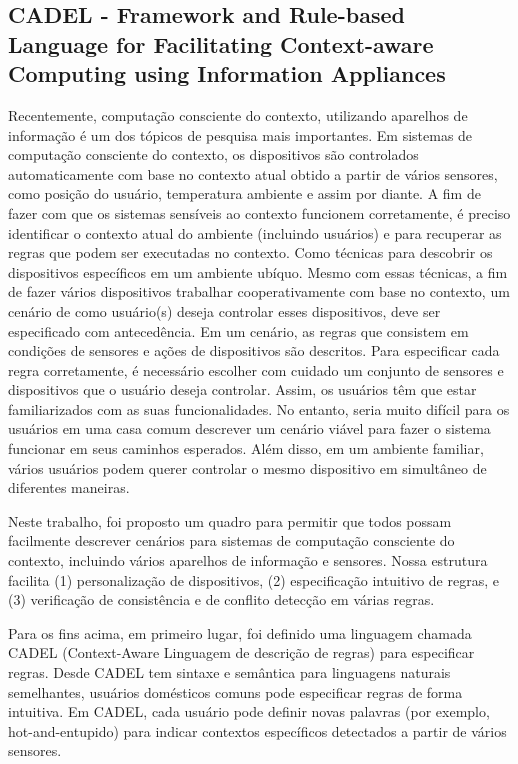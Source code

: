 \documentclass[12pt,a4paper,compsoc]{IEEEtran}
\begin{document}
\subsection{CADEL - Framework and Rule-based Language for Facilitating Context-aware Computing
 using Information Appliances}

  Recentemente, computação consciente do contexto, utilizando aparelhos de informação é um dos
  tópicos de pesquisa mais importantes. Em sistemas de computação consciente do contexto, os
  dispositivos são controlados automaticamente com base no contexto atual obtido a partir de vários
  sensores, como posição do usuário, temperatura ambiente e assim por diante. A fim de fazer com
  que os sistemas sensíveis ao contexto funcionem corretamente, é preciso identificar o contexto
  atual do ambiente (incluindo usuários) e para recuperar as regras que podem ser executadas no
  contexto. Como técnicas para descobrir os dispositivos específicos em um ambiente ubíquo. Mesmo
  com essas técnicas, a fim de fazer vários dispositivos trabalhar cooperativamente com base no
  contexto, um cenário de como usuário(s) deseja controlar esses dispositivos, deve ser
  especificado com antecedência. Em um cenário, as regras que consistem em condições de sensores e
  ações de dispositivos são descritos. Para especificar cada regra corretamente, é necessário
  escolher com cuidado um conjunto de sensores e dispositivos que o usuário deseja controlar.
  Assim, os usuários têm que estar familiarizados com as suas funcionalidades. No entanto, seria
  muito difícil para os usuários em uma casa comum descrever um cenário viável para fazer o sistema
  funcionar em seus caminhos esperados. Além disso, em um ambiente familiar, vários usuários podem
  querer controlar o mesmo dispositivo em simultâneo de diferentes maneiras.
  
  Neste trabalho, foi proposto um quadro para permitir que todos possam facilmente descrever
  cenários para sistemas de computação consciente do contexto, incluindo vários aparelhos de
  informação e sensores. Nossa estrutura facilita (1) personalização de dispositivos, (2)
  especificação intuitivo de regras, e (3) verificação de consistência e de conflito detecção em
  várias regras.
  
  Para os fins acima, em primeiro lugar, foi definido uma linguagem chamada CADEL (Context-Aware
  Linguagem de descrição de regras) para especificar regras. Desde CADEL tem sintaxe e semântica
  para linguagens naturais semelhantes, usuários domésticos comuns pode especificar regras de forma
  intuitiva. Em CADEL, cada usuário pode definir novas palavras (por exemplo, hot-and-entupido)
  para indicar contextos específicos detectados a partir de vários sensores.
  
\end{document}
